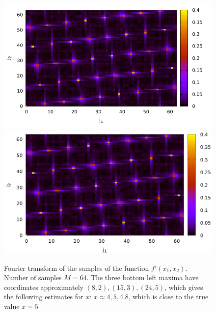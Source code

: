 \begin{figure}
\centering

\ifpdf
\includegraphics[angle=0]
{./part4/quantcomp/picellipticdiscretlog2.pdf}
\else
\includegraphics[angle=0]
{./part4/quantcomp/picellipticdiscretlog2.eps}
\fi

%

\caption{Fourier transform of the samples of the function 
$f'(x_1, x_2)$.
Number of samples $M=64$. The three bottom left maxima have coordinates approximately $(8,2), (15,3), (24,5)$, which gives the following estimates for $x$: $x \approx 4, 5, 4.8$,
which is close to the true value $x = 5$
} 
\label{fig:part4:quantcomp:dle2}
\end{figure}